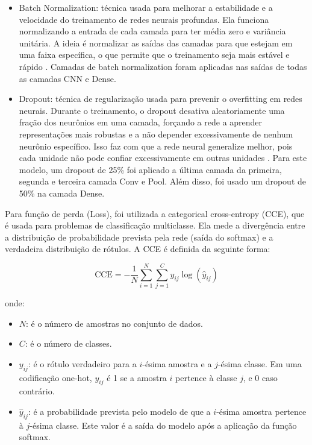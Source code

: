 \documentclass[]{abntex2}
\begin{document}
\begin{itemize}
    \item Batch Normalization: técnica usada para melhorar a estabilidade e a velocidade do treinamento de redes neurais profundas. Ela funciona normalizando a entrada de cada camada para ter média zero e variância unitária. A ideia é normalizar as saídas das camadas para que estejam em uma faixa específica, o que permite que o treinamento seja mais estável e rápido \cite{ioffe2015batch}. Camadas de batch normalization foram aplicadas nas saídas de todas as camadas CNN e Dense.
    \item Dropout: técnica de regularização usada para prevenir o overfitting em redes neurais. Durante o treinamento, o dropout desativa aleatoriamente uma fração dos neurônios em uma camada, forçando a rede a aprender representações mais robustas e a não depender excessivamente de nenhum neurônio específico. Isso faz com que a rede neural generalize melhor, pois cada unidade não pode confiar excessivamente em outras unidades \cite{srivastava2014dropout}. Para este modelo, um dropout de 25\% foi aplicado a última camada da primeira, segunda e terceira camada Conv e Pool. Além disso, foi usado um dropout de 50\% na camada Dense.
\end{itemize}

Para função de perda (Loss), foi utilizada a categorical cross-entropy (CCE), que é usada para problemas de classificação multiclasse. Ela mede a divergência entre a distribuição de probabilidade prevista pela rede (saída do softmax) e a verdadeira distribuição de rótulos. A CCE é definida da seguinte forma:

\[
\text{CCE} = -\dfrac{1}{N}\sum_{i=1}^{N} \sum_{j=1}^{C} y_{ij} \log(\hat{y}_{ij})
\]

onde:

\begin{itemize}
    \item \(N\): é o número de amostras no conjunto de dados.
    \item \(C\): é o número de classes.
    \item \(y_{ij}\): é o rótulo verdadeiro para a \(i\)-ésima amostra e a \(j\)-ésima classe. Em uma codificação one-hot, \(y_{ij}\) é 1 se a amostra \(i\) pertence à classe \(j\), e 0 caso contrário.
    \item \(\hat{y}_{ij}\): é a probabilidade prevista pelo modelo de que a \(i\)-ésima amostra pertence à \(j\)-ésima classe. Este valor é a saída do modelo após a aplicação da função softmax. 
\end{itemize}
\end{document}
